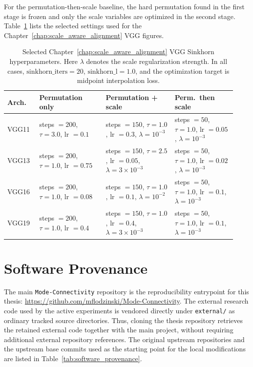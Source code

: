 \documentclass[11pt,a4paper]{report}
\begin{document}
For the permutation-then-scale baseline, the hard permutation found in the first stage is frozen and only the scale variables are optimized in the second stage. Table~\ref{tab:vgg_sinkhorn_repro} lists the selected settings used for the Chapter~\ref{chap:scale_aware_alignment} VGG figures.

\begin{table}[H]
\centering
\small
\begin{tabular}{p{0.13\linewidth}p{0.27\linewidth}p{0.28\linewidth}p{0.25\linewidth}}
\toprule
\textbf{Arch.} & \textbf{Permutation only} & \textbf{Permutation + scale} & \textbf{Perm.\ then scale} \\
\midrule
VGG11 & steps \(=200\), \(\tau=3.0\), lr \(=0.1\) & steps \(=150\), \(\tau=1.0\), lr \(=0.3\), \(\lambda=10^{-3}\) & steps \(=50\), \(\tau=1.0\), lr \(=0.05\), \(\lambda=10^{-3}\) \\
VGG13 & steps \(=200\), \(\tau=1.0\), lr \(=0.75\) & steps \(=150\), \(\tau=2.5\), lr \(=0.05\), \(\lambda=3\times10^{-3}\) & steps \(=50\), \(\tau=1.0\), lr \(=0.02\), \(\lambda=10^{-3}\) \\
VGG16 & steps \(=200\), \(\tau=1.0\), lr \(=0.08\) & steps \(=150\), \(\tau=1.0\), lr \(=0.1\), \(\lambda=10^{-2}\) & steps \(=50\), \(\tau=1.0\), lr \(=0.1\), \(\lambda=10^{-3}\) \\
VGG19 & steps \(=200\), \(\tau=1.0\), lr \(=0.4\) & steps \(=150\), \(\tau=1.0\), lr \(=0.4\), \(\lambda=3\times10^{-3}\) & steps \(=50\), \(\tau=1.0\), lr \(=0.1\), \(\lambda=10^{-3}\) \\
\bottomrule
\end{tabular}
\caption{Selected Chapter~\ref{chap:scale_aware_alignment} VGG Sinkhorn hyperparameters. Here \(\lambda\) denotes the scale regularization strength. In all cases, \(\text{sinkhorn\_iters}=20\), \(\text{sinkhorn\_l}=1.0\), and the optimization target is midpoint interpolation loss.}
\label{tab:vgg_sinkhorn_repro}
\end{table}

\section{Software Provenance}

The main \texttt{Mode-Connectivity} repository is the reproducibility entrypoint for this thesis:
\url{https://github.com/mflodzinski/Mode-Connectivity}.
The external research code used by the active experiments is vendored directly under
\texttt{external/} as ordinary tracked source directories. Thus, cloning the
thesis repository retrieves the retained external code together with the main
project, without requiring additional external repository references.
The original upstream repositories and the upstream base commits used as the
starting point for the local modifications are listed in
Table~\ref{tab:software_provenance}.
\end{document}
